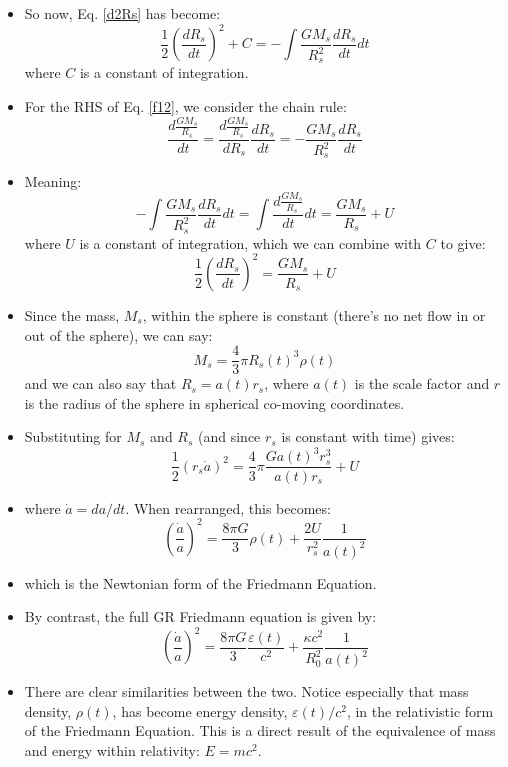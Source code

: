 \documentclass[11pt]{article}
\begin{document}
\begin{itemize}
\begin{equation}
\end{equation}
\item So now, Eq. \ref{d2Rs} has become:
\begin{equation}
    \label{f12}
    \frac{1}{2}\left(\frac{dR_s}{dt}\right)^2 + C = -\int\frac{GM_s}{R_s^2}\frac{dR_s}{dt}dt
\end{equation}
where $C$ is a constant of integration.
\item For the RHS of Eq. \ref{f12}, we consider the chain rule:
\begin{equation}
\frac{d\frac{GM_s}{R_s}}{dt} = \frac{d\frac{GM_s}{R_s}}{dR_s}\frac{dR_s}{dt} = -\frac{GM_s}{R_s^2}\frac{dR_s}{dt}
\end{equation}
\item Meaning:
\begin{equation}
-\int\frac{GM_s}{R_s^2}\frac{dR_s}{dt} dt = \int \frac{d\frac{GM_s}{R_s}}{dt}dt = \frac{GM_s}{R_s} + U
\end{equation}
where $U$ is a constant of integration, which we can combine with $C$ to give:
\begin{equation}
    \frac{1}{2}\left(\frac{dR_s}{dt}\right)^2 = \frac{GM_s}{R_s} + U
\end{equation}
\item Since the mass, $M_s$, within the sphere is constant (there's no net flow in or out of the sphere), we can say:
\begin{equation}
M_s = \frac{4}{3}\pi R_s(t)^3\rho(t)
\end{equation}
and we can also say that $R_s = a(t)r_s$, where $a(t)$ is the scale factor and $r$ is the radius of the sphere in spherical co-moving coordinates.
\item Substituting for $M_s$ and $R_s$ (and since $r_s$ is constant with time) gives:
\begin{equation}
\frac{1}{2}\left(r_s\dot{a}\right)^2 = \frac{4}{3}\pi\frac{Ga(t)^3r_s^3}{a(t)r_s} + U
\end{equation}
\item where $\dot{a} = da/dt$. When rearranged, this becomes:
\begin{equation}
\left(\frac{\dot{a}}{a}\right)^2 = \frac{8\pi G}{3}\rho(t) + \frac{2U}{r_s^2}\frac{1}{a(t)^2}
\end{equation}
\item which is the Newtonian form of the Friedmann Equation.
\item By contrast, the full GR Friedmann equation is given by:
\begin{equation}
\left(\frac{\dot{a}}{a}\right)^2 = \frac{8\pi G}{3}\frac{\varepsilon(t)}{c^2} + \frac{\kappa c^2}{R_0^2}\frac{1}{a(t)^2}    
\end{equation}
\item There are clear similarities between the two. Notice especially that mass density, $\rho(t)$, has become energy density, $\varepsilon(t)/c^2$, in the relativistic form of the Friedmann Equation. This is a direct result of the equivalence of mass and energy within relativity: $E = mc^2$.
\end{itemize}
\end{document}
